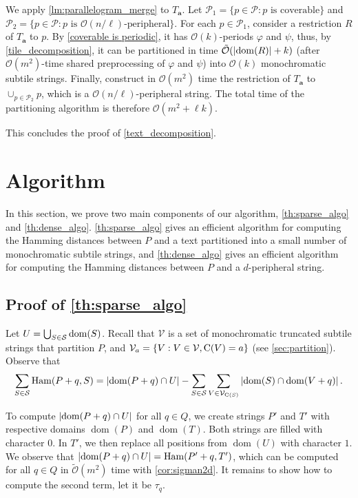 \documentclass[twoside,leqno]{article}
\let\Cref\cref
\renewcommand{\O}{\mathcal{O}}
\newcommand{\tO}{\tilde{\mathcal{O}}}
\renewcommand{\S}{\mathcal{S}}
\newcommand{\V}{\mathcal{V}}
\newcommand{\Ta}{T_\mathbf{a}}
\renewcommand{\phi}{\varphi}
\newcommand{\set}[1]{\left\lbrace #1 \right\rbrace}
\DeclareMathOperator*{\Ham}{Ham}
\DeclareMathOperator*{\dom}{dom}
\newcommand{\absolute}[1]{\left\lvert#1\right\rvert}
\newcommand{\jonas}[2][]{\todo[color=green!40, #1]{\textbf{J:} #2}}
\begin{document}
We apply \cref{lm:parallelogram_merge} to $\Ta$. Let $\mathcal{P}_1 = \{p \in \mathcal{P} : p \text { is coverable}\}$ and $\mathcal{P}_2 = \{p \in \mathcal{P} : p \text { is }\O(n/\ell)\text{-peripheral}\}$. For each $p \in \mathcal{P}_1$, consider a restriction $R$ of $\Ta$ to $p$. By \Cref{coverable is periodic}, it has $\O(k)$-periods $\phi$ and $\psi$, thus, by \Cref{tile_decomposition}, it can be partitioned in time $\tO(\absolute{\d{R}} + k)$ (after $\O(m^2)$-time shared preprocessing of $\phi$ and $\psi$) into $\O(k)$ monochromatic subtile strings. Finally, construct in $\O(m^2)$ time the restriction of $\Ta$ to $\cup_{p \in \mathcal{P}_2} p$, which is a $\O(n / \ell)$-peripheral string. The total time of the partitioning algorithm is therefore $\O(m^2+\ell k)$.

This concludes the proof of \cref{text_decomposition}.

\section{Algorithm}
\label{sec:algorithm}
In this section, we prove two main components of our algorithm, \cref{th:sparse_algo} and \cref{th:dense_algo}. \cref{th:sparse_algo} gives an efficient algorithm for computing the Hamming distances between $P$ and a text partitioned into a small number of monochromatic subtile strings, and \cref{th:dense_algo} gives an efficient algorithm for computing the Hamming distances between $P$ and a $d$-peripheral string.

\subsection{Proof of \cref{th:sparse_algo}}
\restateThmSparseAlgo
Let $U = \bigcup_{S \in \S} \d{S}$. Recall that $\V$ is a set of monochromatic truncated subtile strings that partition $P$, and $\V_a = \set{V : V \in \V, \getchar{V} = a}$ (see \cref{sec:partition}\jonas{have to check this later}).
 Observe that
\begin{align}
\label{eq:sparse}
\sum_{S \in \S} \Ham(P + q, S) = \absolute{\d{P + q} \cap U} - \sum_{S \in \S}\sum_{V \in \V_{\getchar{S}}} \absolute{\d{S} \cap \d{V + q}}.
\end{align}

To compute $\absolute{\d{P + q} \cap U}$ for all $q \in Q$, we create strings $P'$ and $T'$ with respective domains $\dom(P)$ and $\dom(T)$. Both strings are filled with character $0$. 
In $T'$, we then replace all positions from $\dom(U)$ with character $1$. 
We observe that $\absolute{\d{P + q} \cap U} = \Ham(P' + q, T')$, which can be computed for all $q \in Q$ in $\tO(m^2)$ time with \cref{cor:sigman2d}.
It remains to show how to compute the second term, let it be $\tau_q$. 
\end{document}
